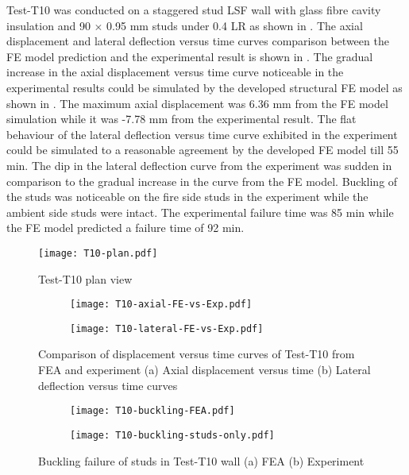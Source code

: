 Test-T10 was conducted on a staggered stud LSF wall with glass fibre cavity insulation and 90 $\times$ 0.95 mm studs under 0.4 LR as shown in . The axial displacement and lateral deflection versus time curves comparison between the FE model prediction and the experimental result is shown in . The gradual increase in the axial displacement versus time curve noticeable in the experimental results could be simulated by the developed structural FE model as shown in . The maximum axial displacement was 6.36 mm from the FE model simulation while it was -7.78 mm from the experimental result. The flat behaviour of the lateral deflection versus time curve exhibited in the experiment could be simulated to a reasonable agreement by the developed FE model till 55 min. The dip in the lateral deflection curve from the experiment was sudden in comparison to the gradual increase in the curve from the FE model. Buckling of the studs was noticeable on the fire side studs in the experiment while the ambient side studs were intact. The experimental failure time was 85 min while the FE model predicted a failure time of 92 min.
\begin{figure}[!htbp]
	\centering
			\texttt{[image: T10-plan.pdf]}\\
		\caption{Test-T10 plan view}
		\label{fig:T10-plan-FEA}
\end{figure}
\begin{figure}[!htbp]
	\centering
	\begin{subfigure}[b]{0.7\textwidth}
		\centering
		\texttt{[image: T10-axial-FE-vs-Exp.pdf]}
		\caption{}
		\label{subfig:T10-axial-FE-vs-Exp}
	\end{subfigure}
	\begin{subfigure}[b]{0.7\textwidth}
		\centering
		\texttt{[image: T10-lateral-FE-vs-Exp.pdf]}
		\caption{}
		\label{subfig:T10-lateral-FE-vs-Exp}
	\end{subfigure}
	   \caption{Comparison of displacement versus time curves of Test-T10 from FEA and experiment (a) Axial displacement versus time (b) Lateral deflection versus time curves}
	   \label{fig:T10-structural-FE-vs-Exp}
\end{figure}
\begin{figure}[!htbp]
	\centering
	\begin{subfigure}[b]{0.9\textwidth}
		\centering
		\texttt{[image: T10-buckling-FEA.pdf]}
		\caption{}
		\label{subfig:T10-buckling-FEA}
	\end{subfigure}
	\begin{subfigure}[b]{0.7\textwidth}
		\centering
		\texttt{[image: T10-buckling-studs-only.pdf]}
		\caption{}
		\label{subfig:T10-buckling-FEA-Exp}
	\end{subfigure}
	   \caption{Buckling failure of studs in Test-T10 wall (a) FEA (b) Experiment}
	   \label{fig:T10-buckling-FE-vs-Exp}
\end{figure} 

